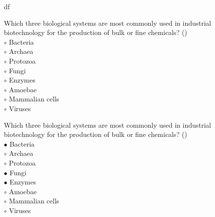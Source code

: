 df\documentclass[]{beamer}
\begin{document}
\begin{CJK}{UTF8}{gbsn}
\begin{frame}[shrink] {}
\addtocounter{questions}{1}
\color{blue}
Which three biological systems are most commonly used in industrial biotechnology for the production of bulk or fine chemicals?
({})\\
\color{black}
\setlength{\parindent}{-0.4cm}
{\color{red}$\circ$}  Bacteria   \\
{\color{red}$\circ$} Archaea   \\
{\color{red}$\circ$} Protozoa  \\
{\color{red}$\circ$}  Fungi  \\
{\color{red}$\circ$}  Enzymes  \\
{\color{red}$\circ$} Amoebae  \\
{\color{red}$\circ$} Mammalian cells  \\
{\color{red}$\circ$} Viruses  \\
\end{frame}
\begin{frame}[shrink] {}
\addtocounter{answers}{1}
\color{blue}
Which three biological systems are most commonly used in industrial biotechnology for the production of bulk or fine chemicals?
({})\\
\color{black}
\setlength{\parindent}{-0.4cm}
{\color{red}$\bullet$} Bacteria   \\
{\color{red}$\circ$} Archaea   \\
{\color{red}$\circ$} Protozoa  \\
{\color{red}$\bullet$} Fungi  \\
{\color{red}$\bullet$} Enzymes  \\
{\color{red}$\circ$} Amoebae  \\
{\color{red}$\circ$} Mammalian cells  \\
{\color{red}$\circ$} Viruses  \\
\end{frame}



\end{CJK}
\end{document}
